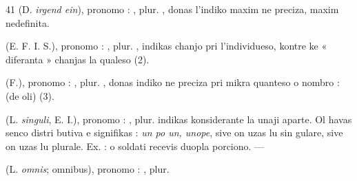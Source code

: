\begin{VUpage}[45]{41}
\VUblancAlinea
{} (D. \textit{irgend ein}), pronomo : , plur. , donas\nl
l'indiko maxim ne preciza, maxim nedefinita.

\VUblancAlinea
{} (E. F. I. S.), pronomo : , plur. , indikas\nl
chanjo pri l'individueso, kontre ke « diferanta » chanjas\nl
la qualeso (2).

\VUblancAlinea
{} (F.), pronomo : , plur. , donas indiko\nl
ne preciza pri mikra quanteso o nombro : \nl
{} (de oli) (3).

\VUblancAlinea
{} (L. \textit{singuli}, E. I.), pronomo : , plur. \nl
indikas konsiderante la unaji aparte. Ol havas senco distri\cc
butiva e signifikas : \textit{un po un, unope}, sive on uzas lu sin\cc
gulare, sive on uzas lu plurale. Ex. :  o soldati\nl
recevis duopla porciono. --- 

\VUblancAlinea
{} (L. \textit{omnis}; omnibus), pronomo : , plur. 
\parplein
\end{VUpage}

